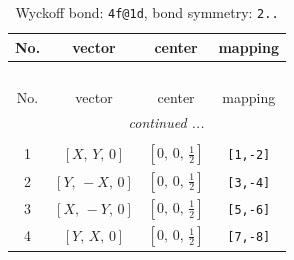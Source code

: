 \documentclass[fleqn,8pt]{jsarticle}
\begin{document}
\renewcommand{\arraystretch}{1.2}
\begin{longtable}{cccc}
\caption{Wyckoff bond: {\tt 4f@1d}, bond symmetry: {\tt 2..}}
 \\
 \hline \hline
No. & vector & center & mapping \\ \hline \endfirsthead

\multicolumn{3}{l}{\tablename\ \thetable{}} \\
 \hline \hline
No. & vector & center & mapping \\ \hline \endhead

 \hline \hline
\multicolumn{3}{r}{\footnotesize\it continued ...} \\ \endfoot

 \hline \hline
\multicolumn{3}{r}{} \\ \endlastfoot

1 & $\left[ X,\, Y,\, 0 \right]$ & $\left[ 0,\, 0,\, \frac{1}{2} \right]$ & {\tt [1,-2]} \\ \hline
2 & $\left[ Y,\, - X,\, 0 \right]$ & $\left[ 0,\, 0,\, \frac{1}{2} \right]$ & {\tt [3,-4]} \\ \hline
3 & $\left[ X,\, - Y,\, 0 \right]$ & $\left[ 0,\, 0,\, \frac{1}{2} \right]$ & {\tt [5,-6]} \\ \hline
4 & $\left[ Y,\, X,\, 0 \right]$ & $\left[ 0,\, 0,\, \frac{1}{2} \right]$ & {\tt [7,-8]} \\
\end{longtable}
\renewcommand{\arraystretch}{1.2}
\end{document}

